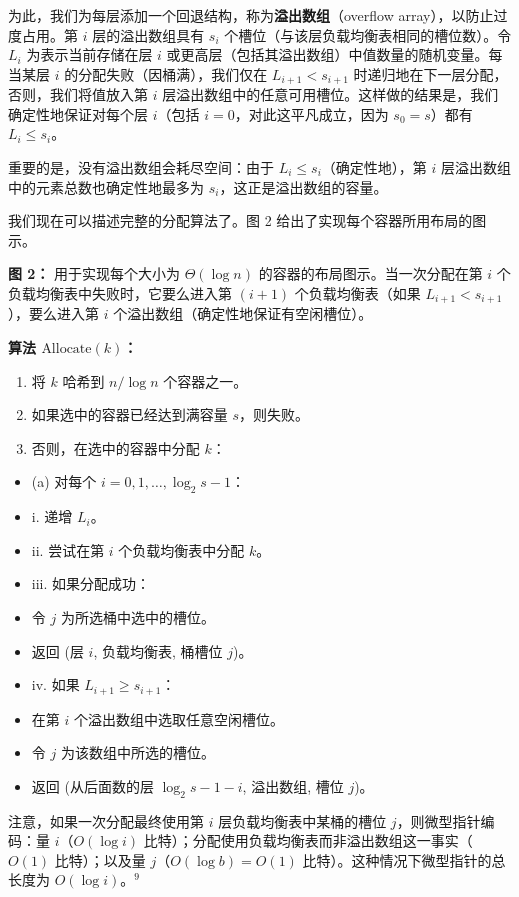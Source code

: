 \documentclass[12pt,a4paper]{ctexart}
\theoremstyle{remark}
\begin{document}
为此，我们为每层添加一个回退结构，称为\textbf{溢出数组}（overflow array），以防止过度占用。第 $i$ 层的溢出数组具有 $s_i$ 个槽位（与该层负载均衡表相同的槽位数）。令 $L_i$ 为表示当前存储在层 $i$ 或更高层（包括其溢出数组）中值数量的随机变量。每当某层 $i$ 的分配失败（因桶满），我们仅在 $L_{i+1}<s_{i+1}$ 时递归地在下一层分配，否则，我们将值放入第 $i$ 层溢出数组中的任意可用槽位。这样做的结果是，我们确定性地保证对每个层 $i$（包括 $i=0$，对此这平凡成立，因为 $s_0=s$）都有 $L_i\leq s_i$。

重要的是，没有溢出数组会耗尽空间：由于 $L_i\leq s_i$（确定性地），第 $i$ 层溢出数组中的元素总数也确定性地最多为 $s_i$，这正是溢出数组的容量。

我们现在可以描述完整的分配算法了。图 2 给出了实现每个容器所用布局的图示。

\textbf{图 2：} 用于实现每个大小为 $\Theta(\log n)$ 的容器的布局图示。当一次分配在第 $i$ 个负载均衡表中失败时，它要么进入第 $(i+1)$ 个负载均衡表（如果 $L_{i+1}<s_{i+1}$），要么进入第 $i$ 个溢出数组（确定性地保证有空闲槽位）。

\textbf{算法 $\text{Allocate}(k)$：}

\begin{enumerate}[label=(\arabic*)]
\item 将 $k$ 哈希到 $n/\log n$ 个容器之一。
\item 如果选中的容器已经达到满容量 $s$，则失败。
\item 否则，在选中的容器中分配 $k$：
\end{enumerate}
\begin{itemize}
\item (a) 对每个 $i=0,1,\ldots,\log_2 s-1$：
\item i. 递增 $L_i$。
\item ii. 尝试在第 $i$ 个负载均衡表中分配 $k$。
\item iii. 如果分配成功：
\item 令 $j$ 为所选桶中选中的槽位。
\item 返回 (层 $i$, 负载均衡表, 桶槽位 $j$)。
\item iv. 如果 $L_{i+1}\geq s_{i+1}$：
\item 在第 $i$ 个溢出数组中选取任意空闲槽位。
\item 令 $j$ 为该数组中所选的槽位。
\item 返回 (从后面数的层 $\log_2 s-1-i$, 溢出数组, 槽位 $j$)。
\end{itemize}

注意，如果一次分配最终使用第 $i$ 层负载均衡表中某桶的槽位 $j$，则微型指针编码：量 $i$（$O(\log i)$ 比特）；分配使用负载均衡表而非溢出数组这一事实（$O(1)$ 比特）；以及量 $j$（$O(\log b)=O(1)$ 比特）。这种情况下微型指针的总长度为 $O(\log i)$。$^9$
\end{document}
